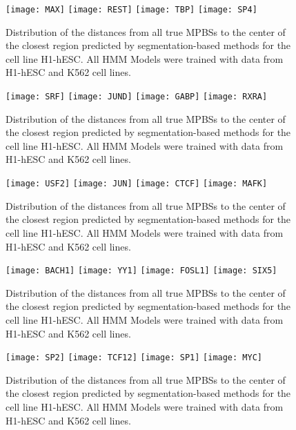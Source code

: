 \documentclass[11pt,a4]{article}
\begin{document}
\begin{figure}[h]
\centering
    \texttt{[image: MAX]}
    \texttt{[image: REST]}
    \texttt{[image: TBP]}
    \texttt{[image: SP4]}
\caption{Distribution of the distances from all true MPBSs to the center of the closest region predicted by segmentation-based methods for the cell line H1-hESC. All HMM Models were trained with data from H1-hESC and K562 cell lines.}
\label{fig:boxplot.H1hesc.fdr_4.1}
\end{figure}

\begin{figure}[h]
\centering
    \texttt{[image: SRF]}
    \texttt{[image: JUND]}
    \texttt{[image: GABP]}
    \texttt{[image: RXRA]}
\caption{Distribution of the distances from all true MPBSs to the center of the closest region predicted by segmentation-based methods for the cell line H1-hESC. All HMM Models were trained with data from H1-hESC and K562 cell lines.}
\label{fig:boxplot.H1hesc.fdr_4.2}
\end{figure}

\begin{figure}[h]
\centering
    \texttt{[image: USF2]}
    \texttt{[image: JUN]}
    \texttt{[image: CTCF]}
    \texttt{[image: MAFK]}
\caption{Distribution of the distances from all true MPBSs to the center of the closest region predicted by segmentation-based methods for the cell line H1-hESC. All HMM Models were trained with data from H1-hESC and K562 cell lines.}
\label{fig:boxplot.H1hesc.fdr_4.3}
\end{figure}

\begin{figure}[h]
\centering
    \texttt{[image: BACH1]}
    \texttt{[image: YY1]}
    \texttt{[image: FOSL1]}
    \texttt{[image: SIX5]}
\caption{Distribution of the distances from all true MPBSs to the center of the closest region predicted by segmentation-based methods for the cell line H1-hESC. All HMM Models were trained with data from H1-hESC and K562 cell lines.}
\label{fig:boxplot.H1hesc.fdr_4.4}
\end{figure}

\begin{figure}[h]
\centering
    \texttt{[image: SP2]}
    \texttt{[image: TCF12]}
    \texttt{[image: SP1]}
    \texttt{[image: MYC]}
\caption{Distribution of the distances from all true MPBSs to the center of the closest region predicted by segmentation-based methods for the cell line H1-hESC. All HMM Models were trained with data from H1-hESC and K562 cell lines.}
\label{fig:boxplot.H1hesc.fdr_4.5}
\end{figure}
\end{document}
